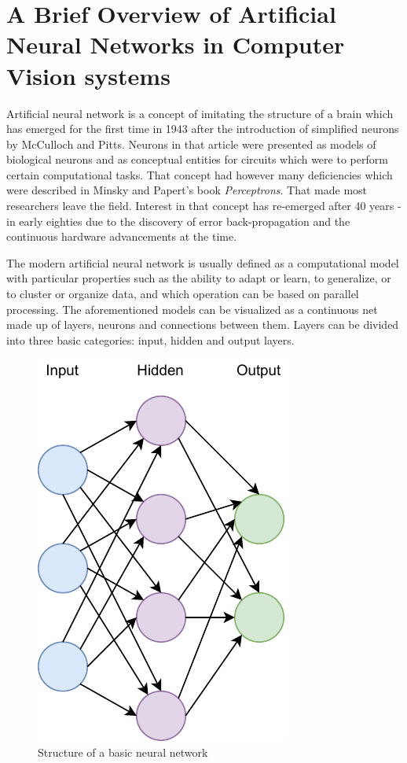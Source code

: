 \documentclass{ijisa}
\begin{document}
\section{A Brief Overview of Artificial Neural Networks in Computer Vision systems}

Artificial neural network is a concept of imitating the structure of a brain which has emerged for the first time in 1943 after the introduction of simplified neurons by McCulloch and Pitts\cite{mcculloch1943logical}. Neurons in that article were presented as models of biological neurons and as conceptual entities for circuits which were to perform certain computational tasks. That concept had however many deficiencies which were described in Minsky and Papert's book \textit{Perceptrons}\cite{minsky2017perceptrons}. That made most researchers leave the field. Interest in that concept has re-emerged after 40 years - in early eighties due to the discovery of error back-propagation and the continuous hardware advancements at the time.

The modern artificial neural network is usually defined as a computational model with particular properties such as the ability to adapt or learn, to generalize, or to cluster or organize data, and which operation can be based on parallel processing\cite{krose1993introduction}. The aforementioned models can be visualized as a continuous net made up of layers, neurons and connections between them. Layers can be divided into three basic categories: input, hidden and output layers. 


\begin{figure}[!h]
\centering
\includegraphics[width=.4\columnwidth]{Images/neural_network.pdf}
\caption{Structure of a basic neural network} \label{fig:fig1}
\end{figure}
\end{document}
